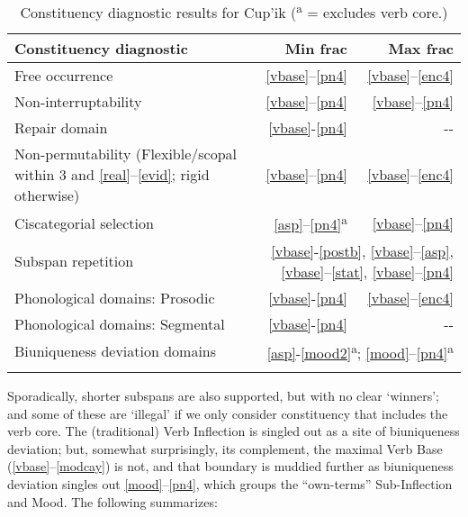 \documentclass[output=paper]{langscibook}
\begin{document}
\begin{table}
\caption{Constituency diagnostic results for Cup'ik (\textsuperscript{a} = excludes verb core.)}
\label{tab:key:2}
\begin{tabular}{p{8cm}rr}
\lsptoprule
{\bfseries Constituency diagnostic} & {\bfseries Min frac} & {\bfseries Max frac}\\\midrule
Free occurrence & \ref{vbase}--\ref{pn4} & \ref{vbase}--\ref{enc4}\\
Non-interruptability & \ref{vbase}--\ref{pn4} & \ref{vbase}--\ref{pn4} \\
Repair domain & \ref{vbase}-\ref{pn4} & {}-{}- \\
Non-permutability (Flexible/scopal within 3 and \ref{real}--\ref{evid}; rigid otherwise) & \ref{vbase}--\ref{pn4} & \ref{vbase}--\ref{enc4} \\
Ciscategorial selection & \ref{asp}--\ref{pn4}\textsuperscript{a} & \ref{vbase}--\ref{pn4}\\
Subspan repetition & \multicolumn{2}{r}{\ref{vbase}-\ref{postb}, \ref{vbase}--\ref{asp}, \ref{vbase}--\ref{stat}, \ref{vbase}--\ref{pn4}}\\
Phonological domains: Prosodic & \ref{vbase}-\ref{pn4} & \ref{vbase}--\ref{enc4}\\
Phonological domains: Segmental & \ref{vbase}-\ref{pn4} & {}-{}-\\
Biuniqueness deviation domains & \multicolumn{2}{r}{\ref{asp}-\ref{mood2}\textsuperscript{a}; \ref{mood}--\ref{pn4}\textsuperscript{a}}\\
\lspbottomrule
\end{tabular}
\end{table}

Sporadically, shorter subspans are also supported, but with no clear `winners'; and some of these are `illegal' if we only consider constituency that includes the verb core. The (traditional) Verb Inflection is singled out as a site of biuniqueness deviation; but, somewhat surprisingly, its complement, the maximal Verb Base (\ref{vbase}--\ref{modcay}) is not, and that boundary is muddied further as biuniqueness deviation singles out \ref{mood}--\ref{pn4}, which groups the ``own-terms'' Sub-Inflection and Mood. The following summarizes:
\end{document}
